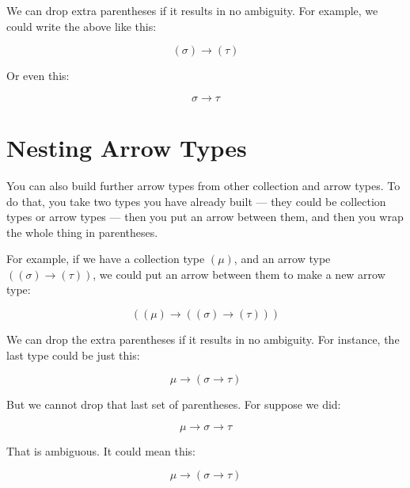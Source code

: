 \documentclass{book}
\numberwithin{equation}{chapter}
\begin{document}
\noindent
We can drop extra parentheses if it results in no ambiguity. For example, we could write the above like this:

\begin{equation}
(\sigma) \rightarrow (\tau)
\end{equation}

\noindent
Or even this:

\begin{equation}
\sigma \rightarrow \tau
\end{equation}



\section{Nesting Arrow Types}

You can also build further arrow types from other collection and arrow types. To do that, you take two types you have already built --- they could be collection types or arrow types --- then you put an arrow between them, and then you wrap the whole thing in parentheses.

For example, if we have a collection type $(\mu)$, and an arrow type $((\sigma) \rightarrow (\tau))$, we could put an arrow between them to make a new arrow type:

\begin{equation}
((\mu) \rightarrow ((\sigma) \rightarrow (\tau)))
\end{equation}

\noindent
We can drop the extra parentheses if it results in no ambiguity. For instance, the last type could be just this:

\begin{equation}
\mu \rightarrow (\sigma \rightarrow \tau)
\end{equation}

\noindent
But we cannot drop that last set of parentheses. For suppose we did:

\begin{equation}
\mu \rightarrow \sigma \rightarrow \tau
\end{equation}

\noindent
That is ambiguous. It could mean this:

\begin{equation}
\mu \rightarrow (\sigma \rightarrow \tau)
\end{equation}
\end{document}
